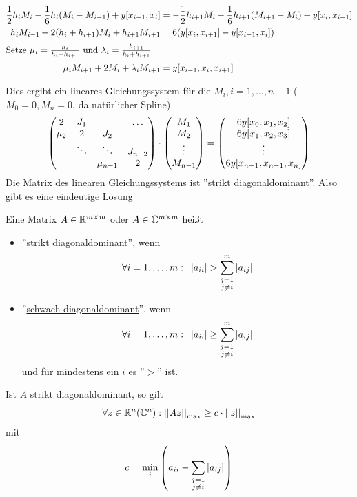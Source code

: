 \begin{align*}
    \frac{1}{2}h_iM_i-\frac{1}{6}h_i(M_i-M_{i-1})+y[x_{i-1},x_i]&=
    -\frac{1}{2}h_{i+1}M_i-\frac{1}{6}h_{i+1}(M_{i+1}-M_{i})+y[x_{i},x_{i+1}] \\
    h_iM_{i-1}+2(h_i+h_{i+1})M_i+h_{i+1}M_{i+1} &= 6(y[x_{i},x_{i+1}]-y[x_{i-1},x_i]) \\
    \intertext{Setze \(\mu_i = \frac{h_i}{h_i+h_{i+1}}\) und \(\lambda_i=\frac{h_{i+1}}{h_i+h_{i+1}}\)}
    \mu_iM_{i+1}+2M_i+\lambda_iM_{i+1}&=y[x_{i-1},x_i,x_{i+1}]
\end{align*}

Dies ergibt ein lineares Gleichungssystem für die $M_i, i=1,\dots,n-1$ ($M_0 = 0, M_n = 0$, da natürlicher Spline)
\[
    \matrx{2&J_1&\ &\dots\\\mu_2&2&J_2& \ \\\ &\ddots&\ddots&J_{n-2}\\\ & \ & \mu_{n-1}&2}\cdot \matrx{
        M_1\\M_2\\\vdots\\M_{n-1}} = \matrx{6y[x_0,x_1,x_2]\\ 6y[x_1,x_2,x_3]\\\vdots\\6y[x_{n-1},x_{n-1},x_n]}
    \]
Die Matrix des linearen Gleichungssystems ist ''strikt diagonaldominant''. Also gibt es eine 
eindeutige Lösung\begin{definition}
    Eine Matrix $A\in \mathbb{R}^{m\times m}$ oder $A\in \mathbb{C}^{m\times m}$ heißt \begin{itemize}\item''\underline{strikt 
    diagonaldominant}'',
    wenn \[
        \forall i=1,\dots,m: \hspace{.5em}\left\vert a_{ii} \right\vert > \displaystyle\sum_{\substack{j=1\\j\neq i}}^m \left\vert a_{ij} \right\vert\]
    \item''\underline{schwach diagonaldominant}'', wenn \[
        \forall i=1,\dots,m: \hspace{.5em}\left\vert a_{ii} \right\vert \geq \displaystyle\sum_{\substack{j=1\\j\neq i}}^m\left\vert a_{ij} \right\vert\]
    und für \underline{mindestens} ein $i$ es ''$>$'' ist.
    \end{itemize}
\end{definition}
\begin{lemma}
    Ist $A$ strikt diagonaldominant, so gilt \[
        \forall z\in\mathbb{R}^n(\mathbb{C}^n): \left\vert\left\vert Az\right\vert\right\vert_{\max} \geq c\cdot \left\vert\left\vert z\right\vert\right\vert_{\max}\]
    mit \[
        c = \min_i\left(a_{ii} - \displaystyle\sum_{\substack{j=1\\j\neq i}}\left\vert a_{ij} \right\vert\right)\]
\end{lemma}

